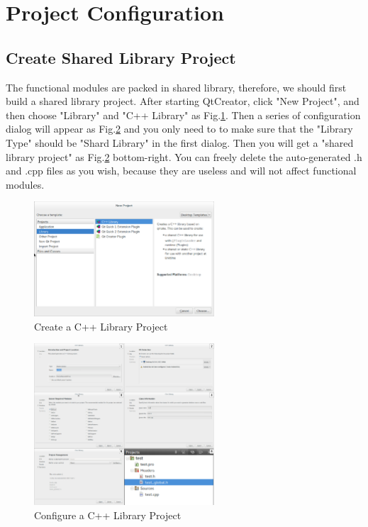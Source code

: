 \documentclass[a4paper,10pt]{book}
\begin{document}
\section{Project Configuration}

\subsection{Create Shared Library Project}

The functional modules are packed in shared library, therefore, we should first build a shared library project. After starting QtCreator, click "New Project",  and then choose "Library" and "C++ Library" as Fig.\ref{fig:newproject1}. Then a series of configuration dialog will appear as Fig.\ref{fig:newproject2} and you only need to to make sure that the "Library Type" should be "Shard Library" in the first dialog. Then you will get a "shared library project" as Fig.\ref{fig:newproject2} bottom-right. You can freely delete the auto-generated .h and .cpp files as you wish, because they are useless and will not affect functional modules.

\begin{figure}
 \centering
 \includegraphics[width=0.6\textwidth]{img/newproject1.eps}
 \caption{Create a C++ Library Project}
 \label{fig:newproject1}
\end{figure}

\begin{figure}
 \centering
 \includegraphics[width=0.6\textwidth]{img/newproject2.eps}
 \caption{Configure a C++ Library Project}
 \label{fig:newproject2}
\end{figure}
\end{document}

